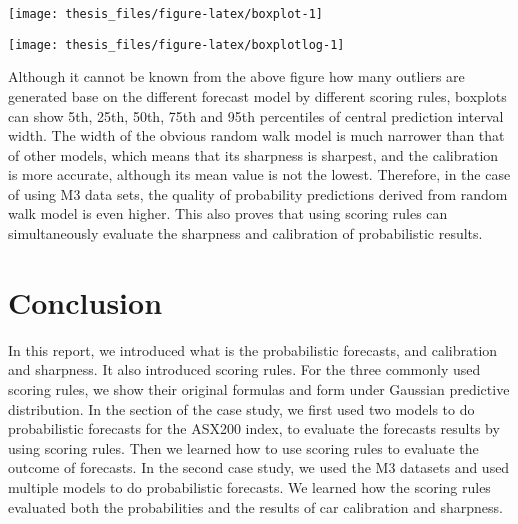 \documentclass{monashthesis}
\theoremstyle{definition}
\theoremstyle{definition}
\theoremstyle{definition}
\theoremstyle{remark}
\begin{document}
\texttt{[image: thesis\_files/figure-latex/boxplot-1]}

\texttt{[image: thesis\_files/figure-latex/boxplotlog-1]}

Although it cannot be known from the above figure how many outliers are
generated base on the different forecast model by different scoring
rules, boxplots can show 5th, 25th, 50th, 75th and 95th percentiles of
central prediction interval width. The width of the obvious random walk
model is much narrower than that of other models, which means that its
sharpness is sharpest, and the calibration is more accurate, although
its mean value is not the lowest. Therefore, in the case of using M3
data sets, the quality of probability predictions derived from random
walk model is even higher. This also proves that using scoring rules can
simultaneously evaluate the sharpness and calibration of probabilistic
results.

\chapter{Conclusion}\label{conclusion}

In this report, we introduced what is the probabilistic forecasts, and
calibration and sharpness. It also introduced scoring rules. For the
three commonly used scoring rules, we show their original formulas and
form under Gaussian predictive distribution. In the section of the case
study, we first used two models to do probabilistic forecasts for the
ASX200 index, to evaluate the forecasts results by using scoring rules.
Then we learned how to use scoring rules to evaluate the outcome of
forecasts. In the second case study, we used the M3 datasets and used
multiple models to do probabilistic forecasts. We learned how the
scoring rules evaluated both the probabilities and the results of car
calibration and sharpness.

\printbibliography[heading=bibintoc]
\end{document}
